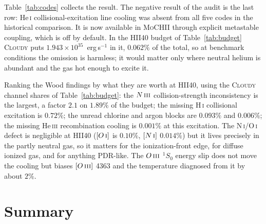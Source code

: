 \documentclass[english,a4paper]{my_memo}
\newcommand{\MoCHII}{\textsc{MoCHII}}
\newcommand{\Cloudy}{\textsc{Cloudy}}
\newcommand{\HI}{H\,\textsc{i}}
\newcommand{\HeI}{He\,\textsc{i}}
\newcommand{\HeIII}{He\,\textsc{iii}}
\newcommand{\OI}{O\,\textsc{i}}
\newcommand{\OIII}{O\,\textsc{iii}}
\newcommand{\NI}{N\,\textsc{i}}
\newcommand{\NIII}{N\,\textsc{iii}}
\begin{document}
Table~\ref{tab:codes} collects the result.  The negative result of the audit is
the last row: \HeI{} collisional-excitation line cooling was absent from all
five codes in the historical comparison. It is now available in \MoCHII{}
through explicit metastable coupling, which is off by default. In the HII40 budget of
Table~\ref{tab:budget} \Cloudy{} puts $1.943\times10^{35}$~erg\,s$^{-1}$ in it,
$0.062\%$ of the total, so at benchmark conditions the omission is harmless; it
would matter only where neutral helium is abundant and the gas hot enough to
excite it.

Ranking the Wood findings by what they are worth at HII40, using the \Cloudy{}
channel shares of Table~\ref{tab:budget}: the $\NIII{}$ collision-strength
inconsistency is the largest, a factor $2.1$ on $1.89\%$ of the budget; the
missing \HI{} collisional excitation is $0.72\%$; the unread chlorine and argon
blocks are $0.093\%$ and $0.006\%$; the missing \HeIII{} recombination cooling
is $0.001\%$ at this excitation.  The \NI{}/\OI{} defect is negligible at HII40
($[\OI{}]$ is $0.10\%$, $[\NI{}]$ $0.014\%$) but it lives precisely in the
partly neutral gas, so it matters for the ionization-front edge, for diffuse
ionized gas, and for anything PDR-like.  The $\OIII{}$ $^1S_0$ energy slip does
not move the cooling but biases $[\OIII{}]$ 4363 and the temperature diagnosed
from it by about $2\%$.

\section{Summary}
\label{sec:summary}
\end{document}
